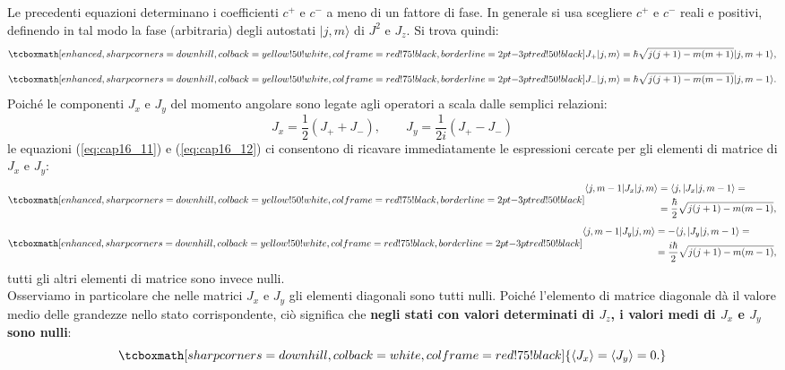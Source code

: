 Le precedenti equazioni determinano i coefficienti $c^+$ e $c^-$ a meno di un fattore di fase. In generale si usa scegliere $c^+$ e $c^-$ reali e positivi, definendo in tal modo la fase (arbitraria) degli autostati $\vert j,m \rangle$ di $J^2$ e $J_z$. Si trova quindi:
	\begin{equation}
		\tcboxmath[enhanced, sharp corners=downhill, colback=yellow!50!white, colframe=red!75!black, borderline={2pt}{-3pt}{red!50!black}]{
 			J_+\vert j, m \rangle =\hbar \sqrt{j(j+1)-m(m+1)}\vert j, m+1 \rangle ,
 			}
	\label{eq:cap16_11}
	\end{equation}
	\begin{equation}
		\tcboxmath[enhanced, sharp corners=downhill, colback=yellow!50!white, colframe=red!75!black, borderline={2pt}{-3pt}{red!50!black}]{
			J_-\vert j, m \rangle =\hbar \sqrt{j(j+1)-m(m-1)}\vert j, m-1 \rangle  .
			}
	\label{eq:cap16_12}
	\end{equation}
Poiché le componenti $J_x$ e $J_y$ del momento angolare sono legate agli operatori a scala dalle semplici relazioni:
\begin{equation}
J_x= \frac{1}{2}\left(J_+ + J_-\right),\qquad J_y= \frac{1}{2i}\left(J_+ - J_-\right)
\end{equation}
le equazioni (\ref{eq:cap16_11}) e (\ref{eq:cap16_12}) ci consentono di ricavare immediatamente le espressioni cercate per gli elementi di matrice di $J_x$ e $J_y$:
	\begin{equation}
		\tcboxmath[enhanced, sharp corners=downhill, colback=yellow!50!white, colframe=red!75!black, borderline={2pt}{-3pt}{red!50!black}]{
		\begin{aligned}
			\langle j, m-1\vert J_x\vert j, m \rangle &=\langle j, \vert J_x\vert j, m-1 \rangle =   \\
			&= \frac{\hbar}{2}\sqrt{j(j+1)-m(m-1)} , 
		\end{aligned}
		}
	\end{equation}
	\begin{equation}
		\tcboxmath[enhanced, sharp corners=downhill, colback=yellow!50!white, colframe=red!75!black, borderline={2pt}{-3pt}{red!50!black}]{
		\begin{aligned}
			\langle j, m-1\vert J_y\vert j, m \rangle &= -\langle j, \vert J_y\vert j, m-1 \rangle =  \\
			&= \frac{i\hbar}{2}\sqrt{j(j+1)-m(m-1)} , 
		\end{aligned}
		}
	\end{equation}
tutti gli altri elementi di matrice sono invece nulli.\\

Osserviamo in particolare che nelle matrici $J_x$ e $J_y$ gli elementi diagonali sono tutti nulli. Poiché l'elemento di matrice diagonale dà il valore medio delle grandezze nello stato corrispondente, ciò significa che \textbf{negli stati con valori determinati di $J_z$, i valori medi di $J_x$ e $J_y$ sono nulli}:
	\begin{equation}
		\tcboxmath[sharp corners=downhill, colback=white, colframe=red!75!black]{
			\langle J_x \rangle = \langle J_y \rangle =0.
		}
	\end{equation}
